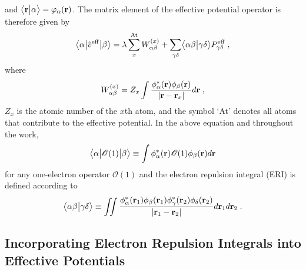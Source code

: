 %
and $\bigl\langle {\bf r} \bigl\lvert {\alpha} \bigr\rangle = \varphi_\alpha({\bf r})$.
The matrix element of the effective potential operator
is therefore given by
%
\begin{equation} \label{e:oep-matrix-element}
	\bigl\langle {\alpha} \bigl\lvert { \hat{v}^{\rm eff} } \bigl\lvert {\beta} \bigr\rangle
	= \lambda \sum_x^{\rm At} W_{\alpha\beta}^{(x)} +
        \sum_{\gamma\delta} \bigl\langle {\alpha\beta} \bigl\lvert {\gamma\delta} \bigr\rangle P^{\rm eff}_{\gamma\delta}  \;,
\end{equation}
%
where 
%
\begin{equation} \label{e:oep-matrix-element-nuc}
 W_{\alpha\beta}^{(x)} = 
 Z_x \int \frac{\phi^*_\alpha({\bf r}) \phi_\beta({\bf r})}{\vert {\bf r} - {\bf r}_x \vert} d{\bf r} \;,
\end{equation}
%
$Z_x$ is the atomic number of the $x$th atom,
and the symbol `At' denotes all atoms that contribute to the effective potential.
In the above equation and throughout the work, 
%
\begin{equation} \label{e:1el-operator}
\bigl\langle {\alpha} \bigl\lvert {\mathscr{O}(1)} \bigl\lvert {\beta} \bigr\rangle \equiv \int \phi^*_\alpha({\bf r}) \mathscr{O}(1) \phi_\beta({\bf r}) d{\bf r} 
\end{equation}
%
for any one\hyp{}electron operator $\mathscr{O}(1)$ 
and the electron repulsion integral (ERI)
is defined according to
%
\begin{equation} \label{e:eri}
	\bigl\langle {\alpha\beta} \bigl\lvert {\gamma\delta} \bigr\rangle \equiv
	\iint 
	\frac{ \phi_\alpha^{*}({\bf r}_1) \phi_\beta({\bf r}_1) 
	       \phi_\gamma^{*}({\bf r}_2) \phi_\delta({\bf r}_2) }{ \vert {\bf r}_1 - {\bf r}_2 \vert}
	d{\bf r}_1 d{\bf r}_2  \;.
\end{equation}
%

\subsection{\label{ss:2.1.oep-technique}Incorporating Electron Repulsion Integrals into Effective Potentials}

